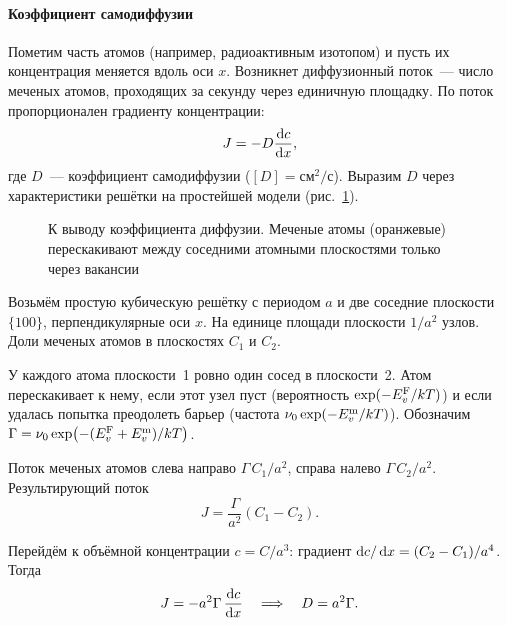 \paragraph{Коэффициент самодиффузии}
Пометим часть атомов (например, радиоактивным изотопом) и пусть их
концентрация меняется вдоль оси $x$. Возникнет диффузионный поток~— число
меченых атомов, проходящих за секунду через единичную площадку. По
 поток пропорционален градиенту концентрации:
\begin{equation}\label{eq:Fick1}
J=-D\frac{\mathop{}\!\mathrm{d} c}{\mathop{}\!\mathrm{d} x},
\end{equation}
где $D$~— коэффициент самодиффузии ($[D]=\text{см}^2/\text{с}$). Выразим $D$
через характеристики решётки на простейшей модели
(рис.~\ref{fig:two-planes}).

\begin{figure}[ht]
\centering
{}
\caption{К выводу коэффициента диффузии. Меченые атомы (оранжевые)
перескакивают между соседними атомными плоскостями только через
вакансии}
\label{fig:two-planes}
\end{figure}

\begin{shagi}
\item Возьмём простую кубическую решётку с периодом $a$ и две соседние
плоскости $\{100\}$, перпендикулярные оси $x$. На единице площади
плоскости $1/a^2$ узлов. Доли меченых атомов в плоскостях $C_1$ и $C_2$.
\item У каждого атома плоскости~1 ровно один сосед в плоскости~2. Атом
перескакивает к нему, если этот узел пуст (вероятность
$\exp(-E_{v}^{\mathrm{F}}/kT)$) и если удалась попытка преодолеть барьер (частота
$\nu_0\exp(-E_{v}^{\mathrm{m}}/kT)$). Обозначим
$\Gamma=\nu_0\exp\bigl(-(E_{v}^{\mathrm{F}}+E_{v}^{\mathrm{m}})/kT\bigr)$.
\item Поток меченых атомов слева направо $\Gamma\,C_1/a^2$, справа налево
$\Gamma\,C_2/a^2$. Результирующий поток
\[
J=\frac{\Gamma}{a^2}(C_1-C_2).
\]
\item Перейдём к объёмной концентрации $c=C/a^3$: градиент
$\mathop{}\!\mathrm{d} c/\mathop{}\!\mathrm{d} x=(C_2-C_1)/a^4$. Тогда
\[
J=-a^2\Gamma\,\frac{\mathop{}\!\mathrm{d} c}{\mathop{}\!\mathrm{d} x}\quad\Longrightarrow\quad D=a^2\Gamma .
\]
\end{shagi}

